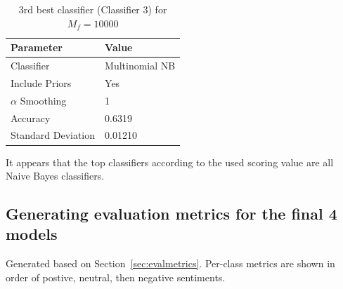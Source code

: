 \documentclass[11pt]{article}
\begin{document}
\begin{table}[!h]
	\begin{center}
		\begin{tabular}{|l|l|}			
			\hline
			Parameter & Value \\
			\hline\hline
			Classifier & Multinomial NB \\
			Include Priors & Yes \\
			$\alpha$ Smoothing & 1 \\
			\hline\hline
			Accuracy &  0.6319\\
			Standard Deviation &   0.01210 \\
			\hline
		\end{tabular}
		\caption{3rd best classifier (Classifier 3) for $M_f = 10000$}
		\label{tbl:3rd10000}
	\end{center}
\end{table}

It appears that the top classifiers according to the used scoring value are all Naive Bayes classifiers.

\subsection{Generating evaluation metrics for the final 4 models}

Generated based on Section~\ref{sec:evalmetrics}. 
Per-class metrics are shown in order of postive, neutral, then negative sentiments.
\end{document}
